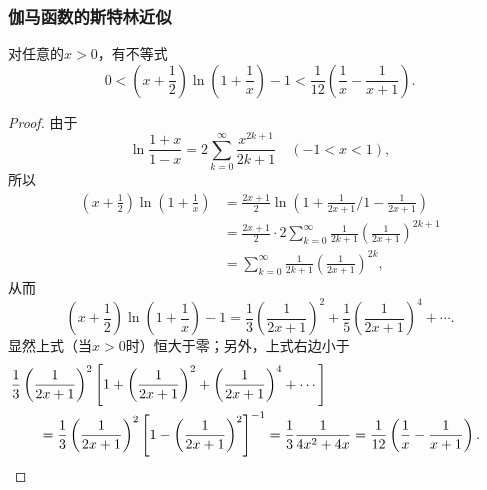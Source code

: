 \subsubsection{伽马函数的斯特林近似}
\begin{lemma}\label{theorem:定积分.伽马函数的斯特灵近似.引理1}
对任意的\(x>0\)，有不等式\begin{equation}\label{equation:定积分.伽马函数的斯特灵近似.引理1}
0 < \left(x+\frac{1}{2}\right) \ln(1+\frac{1}{x}) - 1 < \frac{1}{12}\left(\frac{1}{x}-\frac{1}{x+1}\right).
\end{equation}
\begin{proof}
由于\[
\ln\frac{1+x}{1-x}
= 2 \sum\limits_{k=0}^\infty \frac{x^{2k+1}}{2k+1}
\quad(-1<x<1),
\]所以\begin{align*}
\left(x+\frac{1}{2}\right) \ln(1+\frac{1}{x})
&= \frac{2x+1}{2} \ln({1+\frac{1}{2x+1}}\Bigg/{1-\frac{1}{2x+1}}) \\
&= \frac{2x+1}{2} \cdot
2 \sum\limits_{k=0}^\infty \frac{1}{2k+1} \left(\frac{1}{2x+1}\right)^{2k+1} \\
&= \sum\limits_{k=0}^\infty \frac{1}{2k+1} \left(\frac{1}{2x+1}\right)^{2k},
\end{align*}从而\[
\left(x+\frac{1}{2}\right) \ln(1+\frac{1}{x}) - 1
= \frac{1}{3} \left(\frac{1}{2x+1}\right)^2
+ \frac{1}{5} \left(\frac{1}{2x+1}\right)^4
+ \dotsb.
\]显然上式（当\(x>0\)时）恒大于零；另外，上式右边小于\begin{align*}
&\hspace{-20pt}
\frac{1}{3} \left(\frac{1}{2x+1}\right)^2 \left[
1 + \left(\frac{1}{2x+1}\right)^2 + \left(\frac{1}{2x+1}\right)^4 + \dotsb
\right] \\
&= \frac{1}{3} \left(\frac{1}{2x+1}\right)^2 \left[
1 - \left(\frac{1}{2x+1}\right)^2
\right]^{-1}
= \frac{1}{3} \frac{1}{4x^2 + 4x}
= \frac{1}{12} \left(\frac{1}{x} - \frac{1}{x+1}\right).
\qedhere
\end{align*}
\end{proof}
\end{lemma}

